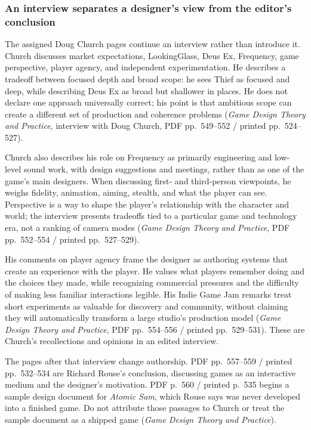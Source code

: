 \subsubsection{An interview separates a designer's view from the editor's conclusion}\label{05-engine-i-ch009-an-interview-separates-a-designers-view-from-the-editors-conclusion}

\hypertarget{05-engine-i-ch009-an-interview-separates-a-designers-view-from-the-editors-conclusion}{}

The assigned Doug Church pages continue an interview rather than introduce it. Church discusses market expectations, LookingGlass, Deus Ex, Frequency, game perspective, player agency, and independent experimentation. He describes a tradeoff between focused depth and broad scope: he sees Thief as focused and deep, while describing Deus Ex as broad but shallower in places. He does not declare one approach universally correct; his point is that ambitious scope can create a different set of production and coherence problems (\emph{Game Design Theory and Practice}, interview with Doug Church, PDF pp.~549--552 / printed pp.~524--527).

Church also describes his role on Frequency as primarily engineering and low-level sound work, with design suggestions and meetings, rather than as one of the game's main designers. When discussing first- and third-person viewpoints, he weighs fidelity, animation, aiming, stealth, and what the player can see. Perspective is a way to shape the player's relationship with the character and world; the interview presents tradeoffs tied to a particular game and technology era, not a ranking of camera modes (\emph{Game Design Theory and Practice}, PDF pp.~552--554 / printed pp.~527--529).

His comments on player agency frame the designer as authoring systems that create an experience with the player. He values what players remember doing and the choices they made, while recognizing commercial pressures and the difficulty of making less familiar interactions legible. His Indie Game Jam remarks treat short experiments as valuable for discovery and community, without claiming they will automatically transform a large studio's production model (\emph{Game Design Theory and Practice}, PDF pp.~554--556 / printed pp.~529--531). These are Church's recollections and opinions in an edited interview.

The pages after that interview change authorship. PDF pp.~557--559 / printed pp.~532--534 are Richard Rouse's conclusion, discussing games as an interactive medium and the designer's motivation. PDF p.~560 / printed p.~535 begins a sample design document for \emph{Atomic Sam}, which Rouse says was never developed into a finished game. Do not attribute those passages to Church or treat the sample document as a shipped game (\emph{Game Design Theory and Practice}).

